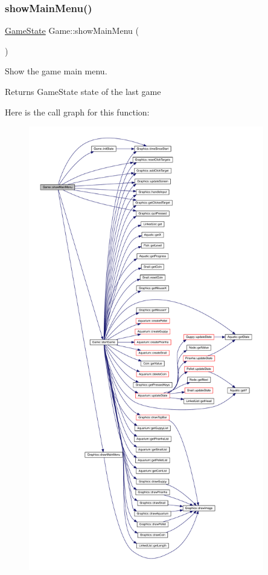 \subsubsection{\texorpdfstring{show\+Main\+Menu()}{showMainMenu()}}
{\footnotesize\ttfamily \mbox{\hyperlink{_constants_8hpp_a7899b65f1ea0f655e4bbf8d2a5714285}{Game\+State}} Game\+::show\+Main\+Menu (\begin{DoxyParamCaption}{ }\end{DoxyParamCaption})}



Show the game main menu. 

\begin{DoxyReturn}{Returns}
Game\+State state of the last game 
\end{DoxyReturn}
Here is the call graph for this function\+:\nopagebreak
\begin{figure}[H]
\begin{center}
\leavevmode
\includegraphics[height=550pt]{class_game_a1bbeccf533a8d660ef5858c1f0cd08b6_cgraph}
\end{center}
\end{figure}
